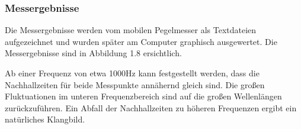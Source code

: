 \documentclass[11pt]{report}
\begin{document}
\subsubsection{Messergebnisse}
Die Messergebnisse werden vom mobilen Pegelmesser als Textdateien aufgezeichnet und wurden sp\"ater am Computer graphisch ausgewertet. Die Messergebnisse sind in Abbildung 1.8 ersichtlich.
\begin{center}
\pgfplotsset{width=14cm}
\end{center}
Ab einer Frequenz von etwa 1000Hz kann festgestellt werden, dass die Nachhallzeiten f\"ur beide Messpunkte ann\"ahernd gleich sind. Die gro\ss en Fluktuationen im unteren Frequenzbereich sind auf die gro\ss en Wellenl\"angen zur\"uckzuf\"uhren. Ein Abfall der Nachhallzeiten zu h\"oheren Frequenzen ergibt ein nat\"urliches Klangbild. 


\end{document}
